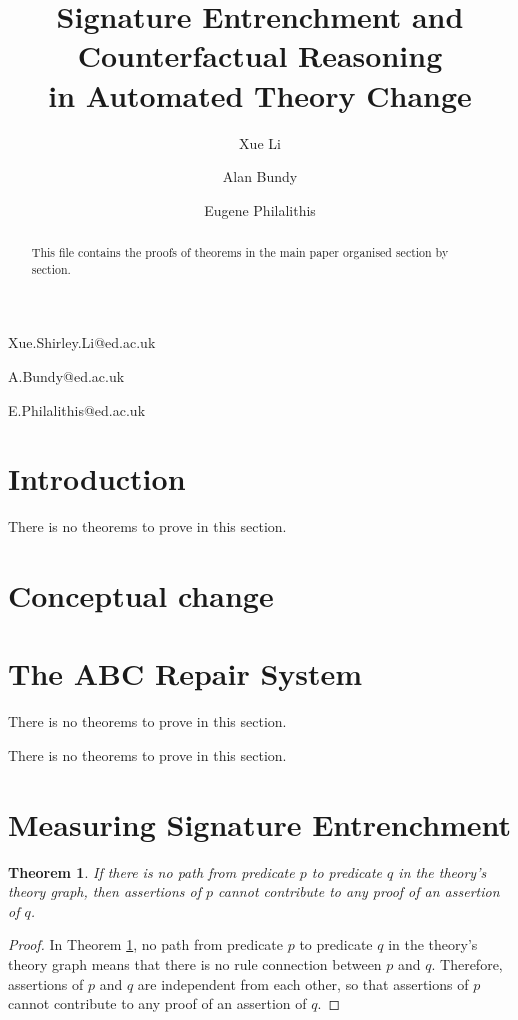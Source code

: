 \documentclass[11pt,letterpaper]{article}
\newtheorem{theorem}{Theorem}[section]
\begin{document}
 

\title{Signature Entrenchment and Counterfactual Reasoning \\
in Automated Theory Change}
 
\author{Xue Li}{Xue.Shirley.Li@ed.ac.uk}
\author{Alan Bundy}{A.Bundy@ed.ac.uk}
\author{Eugene Philalithis}{E.Philalithis@ed.ac.uk}
\address{School of Informatics, University of Edinburgh, UK}
\vskip 0.2in
 
\begin{abstract}
This file contains the proofs of theorems in the main paper organised section by section.   
\end{abstract}

\section{Introduction}
\label{intro}

\noindent 
There is no theorems to prove in this section.

\section{Conceptual change}
\label{sec:conceptualChange}

\section{The ABC Repair System}
\label{sec:operation}
There is no theorems to prove in this section.


 There is no theorems to prove in this section.
\section{Measuring Signature Entrenchment}
\label{sec:ee:sig}
 
\begin{theorem}
\label{therem:ref:theog}
If there is no path from predicate $p$ to predicate $q$ in the theory's theory graph, then assertions of $p$ cannot contribute to any proof of an assertion of $q$.
\end{theorem}
\begin{proof}
In Theorem \ref{therem:ref:theog}, no path from predicate $p$ to predicate $q$ in the theory's theory graph means that there is no rule connection between $p$ and $q$. Therefore, assertions of $p$ and $q$ are independent from each other, so that assertions of $p$ cannot contribute to any proof of an assertion of $q$. 
\end{proof}
\end{document}
